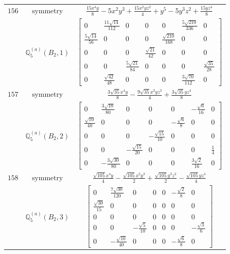 \documentclass[fleqn,8pt,landscape]{jsarticle}
\begin{document}
\begin{longtable}{ccc}
$ 156 $ & $ \text{symmetry} $ & $ \frac{15 x^{4} y}{8} - 5 x^{2} y^{3} + \frac{15 x^{2} y z^{2}}{4} + y^{5} - 5 y^{3} z^{2} + \frac{15 y z^{4}}{8} $ \\
$  $ & $ \mathbb{Q}_{5}^{(a)}(B_{2},1) $ & $ \begin{bmatrix} 0 & \frac{11 \sqrt{14}}{112} & 0 & 0 & 0 & \frac{5 \sqrt{210}}{336} & 0 \\ \frac{5 \sqrt{14}}{56} & 0 & 0 & 0 & \frac{\sqrt{210}}{168} & 0 & 0 \\ 0 & 0 & 0 & \frac{\sqrt{21}}{42} & 0 & 0 & 0 \\ 0 & 0 & \frac{5 \sqrt{21}}{84} & 0 & 0 & 0 & \frac{\sqrt{35}}{28} \\ 0 & \frac{\sqrt{42}}{48} & 0 & 0 & 0 & \frac{3 \sqrt{70}}{112} & 0 \end{bmatrix} $ \\ \hline
$ 157 $ & $ \text{symmetry} $ & $ \frac{3 \sqrt{35} x^{4} y}{8} - \frac{9 \sqrt{35} x^{2} y z^{2}}{4} + \frac{3 \sqrt{35} y z^{4}}{8} $ \\
$  $ & $ \mathbb{Q}_{5}^{(a)}(B_{2},2) $ & $ \begin{bmatrix} 0 & \frac{3 \sqrt{10}}{80} & 0 & 0 & 0 & - \frac{\sqrt{6}}{16} & 0 \\ \frac{\sqrt{10}}{40} & 0 & 0 & 0 & - \frac{\sqrt{6}}{8} & 0 & 0 \\ 0 & 0 & 0 & - \frac{\sqrt{15}}{10} & 0 & 0 & 0 \\ 0 & 0 & - \frac{\sqrt{15}}{20} & 0 & 0 & 0 & \frac{1}{4} \\ 0 & - \frac{3 \sqrt{30}}{80} & 0 & 0 & 0 & \frac{3 \sqrt{2}}{16} & 0 \end{bmatrix} $ \\ \hline
$ 158 $ & $ \text{symmetry} $ & $ \frac{\sqrt{105} x^{4} y}{4} - \frac{\sqrt{105} x^{2} y^{3}}{2} + \frac{\sqrt{105} y^{3} z^{2}}{2} - \frac{\sqrt{105} y z^{4}}{4} $ \\
$  $ & $ \mathbb{Q}_{5}^{(a)}(B_{2},3) $ & $ \begin{bmatrix} 0 & \frac{7 \sqrt{30}}{120} & 0 & 0 & 0 & - \frac{\sqrt{2}}{8} & 0 \\ \frac{\sqrt{30}}{15} & 0 & 0 & 0 & 0 & 0 & 0 \\ 0 & 0 & 0 & 0 & 0 & 0 & 0 \\ 0 & 0 & - \frac{\sqrt{5}}{10} & 0 & 0 & 0 & - \frac{\sqrt{3}}{6} \\ 0 & - \frac{\sqrt{10}}{40} & 0 & 0 & 0 & - \frac{\sqrt{6}}{8} & 0 \end{bmatrix} $ \\ \hline

\end{longtable}
\end{document}
